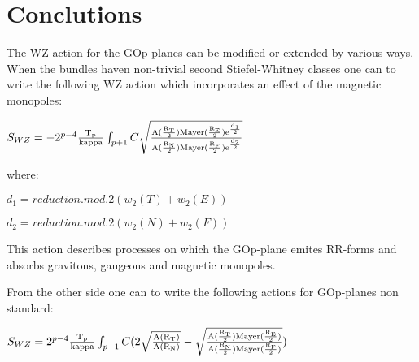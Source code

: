 \documentclass[a4paper,a4paper]{article}
\begin{document}
\section{Conclutions}

The WZ action for the GOp-planes can be modified or extended by various ways.
When the bundles haven non-trivial second Stiefel-Whitney classes one can to write the following WZ action which incorporates an effect of the magnetic monopoles:

\begin{center}
{  $ S_{WZ} = -2^{p-4}\frac{\rm T_p}{\rm kappa}\int_{p+1} C\sqrt{\frac{\rm A(\frac{\rm R_T}{\rm 2})Mayer(\frac{\rm R_E}{\rm 2})e^{\frac{\rm d_1}{\rm 2}}}{\rm A(\frac{\rm R_N}{\rm 2})Mayer(\frac{\rm R_F}{\rm 2})e^{\frac{\rm d_2}{\rm 2}}}}$ }
\end{center}

where:

\begin{center}
{  $ d_1 = reduction.mod.2(w_2(T)+w_2(E))$ }
\end{center}

\begin{center}
{  $ d_2 = reduction.mod.2(w_2(N)+w_2(F))$ }
\end{center}

This action describes processes on which the GOp-plane emites RR-forms and absorbs gravitons, gaugeons and magnetic monopoles.

From the other side one can to write the following actions for GOp-planes non 
standard:

\begin{center}
{  $ S_{WZ} = 2^{p-4}\frac{\rm T_p}{\rm kappa}\int_{p+1} C(2\sqrt{\frac{\rm A(R_T)}{\rm A(R_N)}}-\sqrt{\frac{\rm A(\frac{\rm R_T}{\rm 2})Mayer(\frac{\rm R_E}{\rm 2})}{\rm A(\frac{\rm R_N}{\rm 2})Mayer(\frac{\rm R_F}{\rm 2})}})$ }
\end{center}
\end{document}
